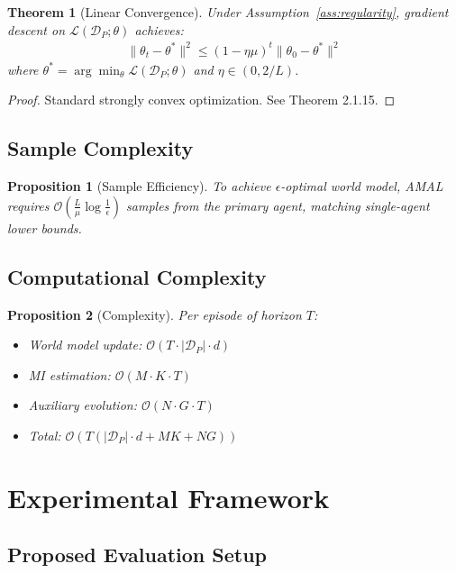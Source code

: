 \documentclass[12pt, a4paper]{article}
\newtheorem{theorem}{Theorem}
\newtheorem{proposition}{Proposition}
\begin{document}
\begin{theorem}[Linear Convergence]\label{thm:convergence}
Under Assumption~\ref{ass:regularity}, gradient descent on $\mathcal{L}(\mathcal{D}_P; \theta)$ achieves:
\begin{align}
\|\theta_t - \theta^*\|^2 \leq (1 - \eta\mu)^t \|\theta_0 - \theta^*\|^2
\end{align}
where $\theta^* = \arg\min_\theta \mathcal{L}(\mathcal{D}_P; \theta)$ and $\eta \in (0, 2/L)$.
\end{theorem}

\begin{proof}
Standard strongly convex optimization. See \cite{nesterov2018lectures} Theorem 2.1.15.
\end{proof}

\subsection{Sample Complexity}

\begin{proposition}[Sample Efficiency]
To achieve $\epsilon$-optimal world model, AMAL requires $\mathcal{O}(\frac{L}{\mu} \log \frac{1}{\epsilon})$ samples from the primary agent, matching single-agent lower bounds.
\end{proposition}

\subsection{Computational Complexity}

\begin{proposition}[Complexity]
Per episode of horizon $T$:
\begin{itemize}
\item World model update: $\mathcal{O}(T \cdot |\mathcal{D}_P| \cdot d)$
\item MI estimation: $\mathcal{O}(M \cdot K \cdot T)$
\item Auxiliary evolution: $\mathcal{O}(N \cdot G \cdot T)$
\item Total: $\mathcal{O}(T(|\mathcal{D}_P| \cdot d + MK + NG))$
\end{itemize}
\end{proposition}

\section{Experimental Framework}

\subsection{Proposed Evaluation Setup}
\end{document}
